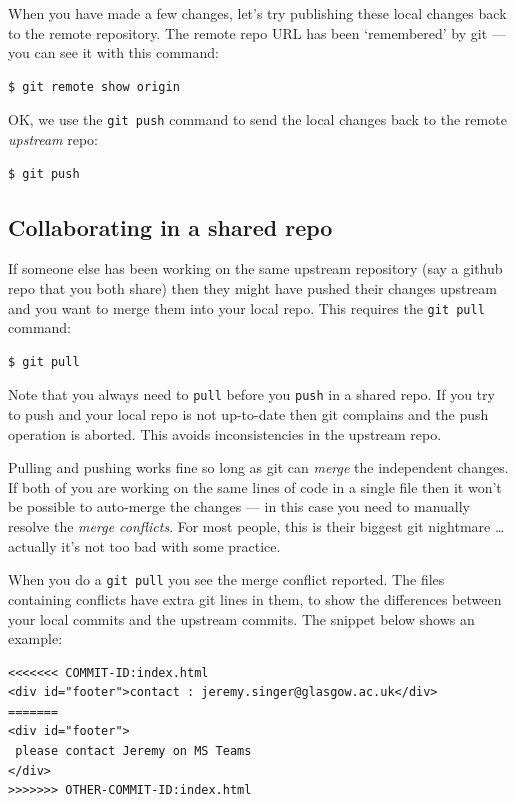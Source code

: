 \documentclass{article}
\begin{document}
When you have made a few changes, let's try publishing these local changes back to the remote repository. The remote repo URL has been `remembered' by git --- you can see it with this command:

\begin{lstlisting}[style=BashInputStyle]
    $ git remote show origin
\end{lstlisting}

OK, we use the \texttt{git push} command to send the local changes back to the remote \emph{upstream} repo:

\begin{lstlisting}[style=BashInputStyle]
    $ git push
\end{lstlisting}


\subsection*{Collaborating in a shared repo}

If someone else has been working on the same upstream repository (say
a github repo that you both share) then they might have pushed their changes
upstream and you want to merge them into your local repo. This requires
the \texttt{git pull} command:

\begin{lstlisting}[style=BashInputStyle]
    $ git pull
\end{lstlisting}

Note that you always need to \texttt{pull} before you \texttt{push} in a shared repo. If you try to push and your local repo is not up-to-date then git complains
and the push operation is aborted. This avoids inconsistencies in
the upstream repo.

Pulling and pushing works fine so long as git can \emph{merge} the independent changes. If both of you are working on the same lines of code in a single file then it won't be possible to auto-merge the changes --- in this case you need to manually resolve the \emph{merge conflicts}. For most people, this is their biggest git nightmare \ldots actually it's not too bad with some practice.

When you do a \texttt{git pull} you see the merge conflict reported.
The files containing conflicts have extra git lines in them, to show the
differences between your local commits and the upstream commits. The snippet below shows an example:
\begin{verbatim}
<<<<<<< COMMIT-ID:index.html
<div id="footer">contact : jeremy.singer@glasgow.ac.uk</div>
=======
<div id="footer">
 please contact Jeremy on MS Teams
</div>
>>>>>>> OTHER-COMMIT-ID:index.html
\end{verbatim}
\end{document}
